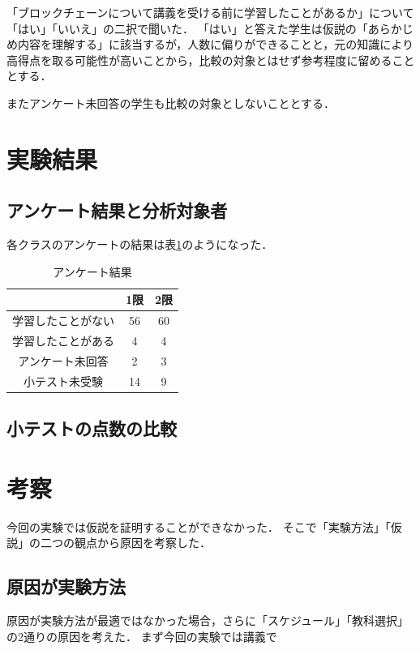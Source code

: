 \documentclass[a4j,12pt]{jsarticle}
\begin{document}
「ブロックチェーンについて講義を受ける前に学習したことがあるか」について「はい」「いいえ」の二択で聞いた．
「はい」と答えた学生は仮説の「あらかじめ内容を理解する」に該当するが，人数に偏りができることと，元の知識により高得点を取る可能性が高いことから，比較の対象とはせず参考程度に留めることとする．

またアンケート未回答の学生も比較の対象としないこととする．

\newpage
\section{実験結果}
\subsection{アンケート結果と分析対象者}
各クラスのアンケートの結果は表\ref{fig:ank}のようになった．

\begin{table}[H]
\centering
\begin{tabular}{|c|c|c|}
\hline
\multicolumn{1}{|l|}{} & \multicolumn{1}{l|}{1限} & \multicolumn{1}{l|}{2限} \\ \hline
学習したことがない              & 56                      & 60                      \\ \hline
学習したことがある              & 4                       & 4                       \\ \hline
アンケート未回答               & 2                       & 3                       \\ \hline
小テスト未受験                & 14                      & 9                       \\ \hline
\end{tabular}
\caption{アンケート結果}
\label{fig:ank}
\end{table}


\subsection{小テストの点数の比較}

\newpage
\section{考察}
今回の実験では仮説を証明することができなかった．
そこで「実験方法」「仮説」の二つの観点から原因を考察した．

\subsection{原因が実験方法}
原因が実験方法が最適ではなかった場合，さらに「スケジュール」「教科選択」の2通りの原因を考えた．
まず今回の実験では講義で
\end{document}

